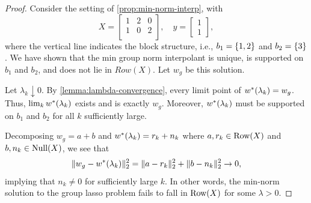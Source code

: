 \rowCE*
\begin{proof}
    Consider the setting of \cref{prop:min-norm-interp},
    with
    \[
        X =
        \left[
            \begin{array}{cc|c}
                1 & 2 & 0 \\
                1 & 0 & 2 \\
            \end{array}
            \right],
        \quad
        y = \begin{bmatrix}
            1 \\
            1
        \end{bmatrix},
    \]
    where the vertical line indicates the block structure, i.e.,
    \( b_1 = \left\{1, 2\right\} \) and \( b_2 = \left\{3\right\} \).
    We have shown that the min group norm interpolant is unique,
    is supported on \( b_1 \) and \( b_2 \), and does not lie
    in \( Row(X) \).
    Let \( w_g \) be this solution.

    Let \( \lambda_k \downarrow 0 \).
    By \cref{lemma:lambda-convergence}, every limit point of
    \( w^*(\lambda_k) = w_g \).
    Thus, \( \lim_k w^*(\lambda_k) \) exists and is exactly
    \( w_g \).
    Moreover, \( w^*(\lambda_k) \) must be supported
    on \( b_1 \) and \( b_2 \) for all \( k \) sufficiently large.

    Decomposing \( w_g = a + b \) and \( w^*(\lambda_k) = r_k + n_k \)
    where \( a, r_k \in \text{Row}(X) \) and \( b, n_k \in \text{Null}(X) \), we see
    that
    \[
        \|w_g - w^*(\lambda_k)\|_2^2
        = \|a - r_k\|_2^2
        + \|b - n_k\|_2^2 \rightarrow 0,
    \]
    implying that \( n_k \neq 0 \) for sufficiently large \( k \).
    In other words, the min-norm solution to the group lasso problem
    fails to fall in \( \text{Row}(X) \) for some \( \lambda > 0 \).
\end{proof}


